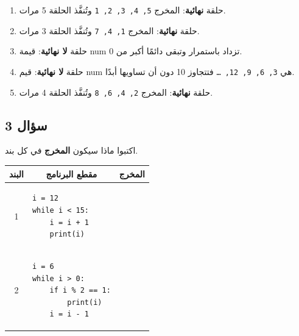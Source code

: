 \documentclass[14pt]{extarticle}
\begin{document}
\ifwithsols
\begin{boxSolution}
\begin{enumerate}[label=\arabic*., itemsep=1em]
    \item حلقة \textbf{نهائية}: المخرج \textenglish{\texttt{5, 4, 3, 2, 1}} وتُنفَّذ الحلقة 5 مرات.
    \item حلقة \textbf{نهائية}: المخرج \textenglish{\texttt{1, 4, 7}} وتُنفَّذ الحلقة 3 مرات.
    \item حلقة \textbf{لا نهائية}: قيمة \textenglish{num} تزداد باستمرار وتبقى دائمًا أكبر من 0.
    \item حلقة \textbf{لا نهائية}: قيم \textenglish{num} هي \textenglish{\texttt{3, 6, 9, 12, \ldots}} فتتجاوز 10 دون أن تساويها أبدًا.
    \item حلقة \textbf{نهائية}: المخرج \textenglish{\texttt{2, 4, 6, 8}} وتُنفَّذ الحلقة 4 مرات.
\end{enumerate}
\end{boxSolution}
\fi

\clearpage
\subsection*{سؤال 3}
اكتبوا ماذا سيكون \textbf{المخرج} في كل بند.

{\small
\renewcommand{\arraystretch}{1.3}
\begin{longtable}{|c|p{}|p{}|}
\hline
\multicolumn{1}{|c|}{\textbf{البند}} & \multicolumn{1}{c|}{\textbf{مقطع البرنامج}} & \multicolumn{1}{c|}{\textbf{المخرج}} \\
\hline
\endhead
1 &
\begin{pycell}
\begin{english}
\begin{verbatim}
i = 12
while i < 15:
    i = i + 1
    print(i)
\end{verbatim}
\end{english}
\end{pycell} & \rule{0pt}{1.7cm} \\
\hline
2 &
\begin{pycell}
\begin{english}
\begin{verbatim}
i = 6
while i > 0:
    if i % 2 == 1:
        print(i)
    i = i - 1
\end{verbatim}
\end{english}
\end{pycell} & \rule{0pt}{1.7cm} \\
\hline
\end{longtable}
}
\end{document}
